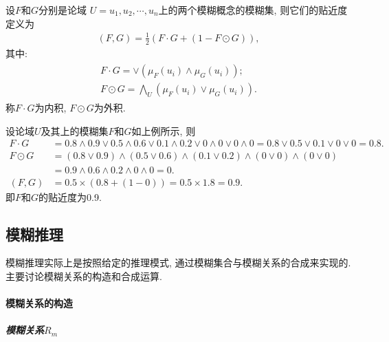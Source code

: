 设$F$和$G$分别是论域 $U={u_1, u_2, \cdots, u_n}$上的两个模糊概念的模糊集, 则它们的贴近度定义为
\begin{align}
    (F, G)=\frac 1 2( F\cdot G+(1-F\odot G)),
\end{align}
其中:
\begin{align}
\begin{array}{l}
F \cdot G=\vee\left(\mu_{F}\left(u_{i}\right) \wedge \mu_{G}\left(u_{i}\right)\right);\\
F \odot G=\bigwedge_{U}\left(\mu_{F}\left(u_{i}\right) \vee \mu_{G}\left(u_{i}\right)\right).
\end{array}
\end{align}
称$F\cdot G$为内积, $F\odot G$为外积.
\begin{example}
设论域$U$及其上的模糊集$F$和$G$如上例所示, 则
\begin{align*}
F\cdot G&=0.8\wedge 0.9\vee 0.5\wedge 0.6\vee 0.1\wedge 0.2 \vee  0\wedge 0\vee  0\wedge 0=0.8\vee 0.5\vee 0.1 \vee  0 \vee  0=0.8.\\
F\odot G&= (0.8\vee 0.9)\wedge (0.5\vee 0.6)\wedge (0.1\vee 0.2) \wedge (0\vee 0) \wedge (0\vee 0)\\
        &=0.9\wedge 0.6\wedge 0.2\wedge 0\wedge 0 =0.\\
(F, G)&=0.5\times (0.8+(1-0))=0.5\times 1.8=0.9.
\end{align*}
即$F$和$G$的贴近度为0.9.
\end{example}

\subsection{模糊推理}
模糊推理实际上是按照给定的推理模式, 通过模糊集合与模糊关系的合成来实现的. 主要讨论模糊关系的构造和合成运算.

\paragraph{模糊关系的构造}
\subparagraph{\textbf{模糊关系$R_m$}}

